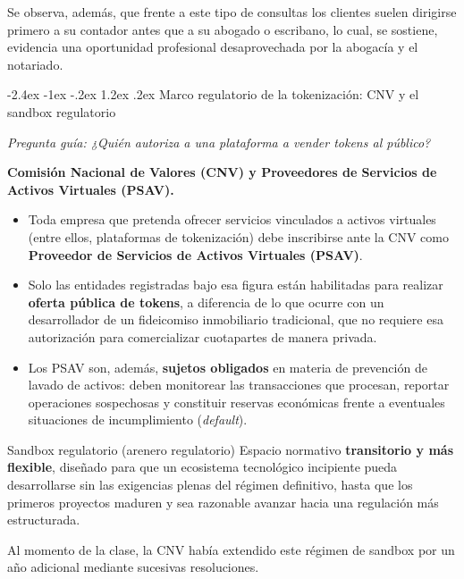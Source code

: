 \documentclass[12pt,oneside]{book}
\makeatletter
\renewcommand\section{\@startsection{section}{1}{\z@}%
  {-2.4ex \@plus -1ex \@minus -.2ex}%
  {1.2ex \@plus .2ex}%
  {\normalfont\Large\bfseries\color{blue!50!black}}}
\newcommand{\guia}[1]{\noindent\textit{Pregunta guía: #1}\par\smallskip}
\makeatother
\begin{document}
Se observa, además, que frente a este tipo de consultas los clientes suelen dirigirse primero a su contador antes que a su abogado o escribano, lo cual, se sostiene, evidencia una oportunidad profesional desaprovechada por la abogacía y el notariado.

\section{Marco regulatorio de la tokenización: CNV y el sandbox regulatorio}

\guia{¿Quién autoriza a una plataforma a vender tokens al público?}

\begin{important}
\textbf{Comisión Nacional de Valores (CNV) y Proveedores de Servicios de Activos Virtuales (PSAV).}
\begin{itemize}
    \item Toda empresa que pretenda ofrecer servicios vinculados a activos virtuales (entre ellos, plataformas de tokenización) debe inscribirse ante la CNV como \textbf{Proveedor de Servicios de Activos Virtuales (PSAV)}.
    \item Solo las entidades registradas bajo esa figura están habilitadas para realizar \textbf{oferta pública de tokens}, a diferencia de lo que ocurre con un desarrollador de un fideicomiso inmobiliario tradicional, que no requiere esa autorización para comercializar cuotapartes de manera privada.
    \item Los PSAV son, además, \textbf{sujetos obligados} en materia de prevención de lavado de activos: deben monitorear las transacciones que procesan, reportar operaciones sospechosas y constituir reservas económicas frente a eventuales situaciones de incumplimiento (\textit{default}).
\end{itemize}
\end{important}

\begin{definition}{Sandbox regulatorio (arenero regulatorio)}
Espacio normativo \textbf{transitorio y más flexible}, diseñado para que un ecosistema tecnológico incipiente pueda desarrollarse sin las exigencias plenas del régimen definitivo, hasta que los primeros proyectos maduren y sea razonable avanzar hacia una regulación más estructurada.
\end{definition}

Al momento de la clase, la CNV había extendido este régimen de sandbox por un año adicional mediante sucesivas resoluciones.
\end{document}
